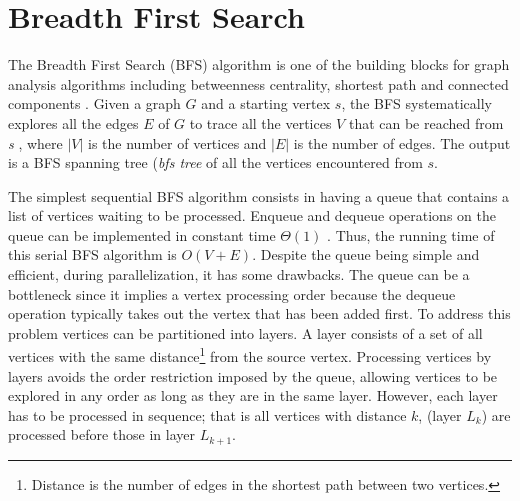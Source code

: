 \documentclass{sig-alternate-05-2015}
\begin{document}
\section{Breadth First Search}
\label{sec:BFS}
 The Breadth First Search (BFS) algorithm is one of the building
 blocks for graph analysis algorithms including betweenness
 centrality, shortest path and connected components
 \cite{graphanalytics}. Given a graph $G$ and a starting vertex $s$,
 the BFS systematically explores all the edges $E$ of $G$ to trace all
 the vertices $V$ that can be reached from \textit{s} \cite{Cormen},
 where $|V|$ is the number of vertices and $|E|$ is the number of
 edges. The output is a BFS spanning tree ({\em bfs tree} of all the
 vertices encountered from $s$.
 
 







The simplest sequential BFS algorithm consists in having a queue that
contains a list of vertices waiting to be processed. Enqueue and
dequeue operations on the queue can be implemented in constant time
$\Theta(1)$ \cite{leiserson}. Thus, the running time of this serial
BFS algorithm is $O(V+E)$. Despite the queue being simple and
efficient, during parallelization, it has some drawbacks. The queue
can be a bottleneck since it implies a vertex processing order because
the dequeue operation typically takes out the vertex that has been
added first. To address this problem vertices can be partitioned into
layers. A layer consists of a set of all vertices with the same
distance\footnote{Distance is the number of edges in the shortest path
  between two vertices.} from the source vertex. Processing vertices
by layers avoids the order restriction imposed by the queue, allowing
vertices to be explored in any order as long as they are in the same
layer. However, each layer has to be processed in sequence; that is
all vertices with distance $k$, (layer $L_{k}$) are processed before
those in layer $L_{k+1}$.
\end{document}
